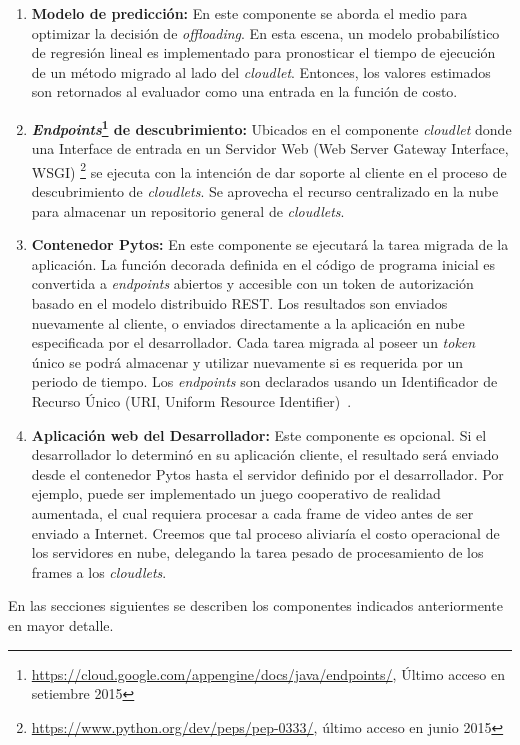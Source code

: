 \begin{enumerate}
\begin{itemize}
\end{itemize}
 \item \textbf{Modelo de predicción:} En este componente se aborda el medio para optimizar la decisión de \textit{offloading}. En esta escena,
 un modelo probabilístico de regresión lineal es implementado para pronosticar el tiempo de ejecución de un método migrado al lado del
 \textit{cloudlet}. Entonces, los valores estimados son retornados al evaluador como una entrada en la función de costo.
 \item \textbf{\textit{Endpoints}\footnote{\url{https://cloud.google.com/appengine/docs/java/endpoints/}, Último acceso en setiembre 2015} de descubrimiento:} Ubicados en el componente \textit{cloudlet} donde una Interface de entrada en un Servidor
 Web (Web Server Gateway Interface, WSGI) \footnote{\url{https://www.python.org/dev/peps/pep-0333/}, último acceso en junio 2015} se ejecuta con la intención de dar soporte al cliente en el proceso de descubrimiento
 de \textit{cloudlets}. Se aprovecha el recurso centralizado en la nube para almacenar un repositorio general de \textit{cloudlets}.
 \item \textbf{Contenedor Pytos:} En este componente se ejecutará la tarea migrada de la aplicación. La función decorada definida 
 en el 
 código de programa inicial es convertida a \textit{endpoints} abiertos y accesible con un token de autorización basado en el modelo 
 distribuido REST. Los resultados son enviados nuevamente al cliente, o enviados directamente a la aplicación en nube especificada por el 
 desarrollador. Cada tarea migrada al poseer un \emph{token} único se podrá almacenar y utilizar nuevamente si es requerida por un periodo de tiempo.
 Los \textit{endpoints} son declarados usando un Identificador de Recurso Único (URI, Uniform Resource Identifier)~\cite{Walsh_architectureof}.
 \item \textbf{Aplicación web del Desarrollador:} Este componente es opcional. Si el desarrollador lo determinó en su aplicación cliente, el resultado 
 será enviado desde el contenedor Pytos hasta el servidor definido por el desarrollador. Por ejemplo, puede ser implementado un juego cooperativo 
 de realidad aumentada, el cual requiera procesar a cada frame de video antes de ser enviado a Internet. Creemos que tal proceso aliviaría 
 el costo operacional de los servidores en nube, delegando la tarea pesado de procesamiento de los frames a los \emph{cloudlets}. 
 
\end{enumerate}
En las secciones siguientes se describen los componentes indicados anteriormente en mayor detalle.

